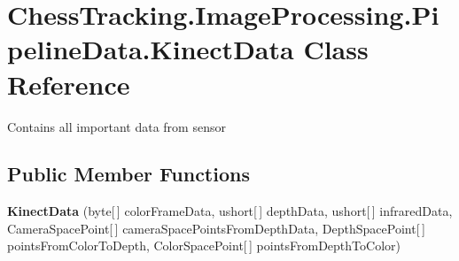 \hypertarget{class_chess_tracking_1_1_image_processing_1_1_pipeline_data_1_1_kinect_data}{}\section{Chess\+Tracking.\+Image\+Processing.\+Pipeline\+Data.\+Kinect\+Data Class Reference}
\label{class_chess_tracking_1_1_image_processing_1_1_pipeline_data_1_1_kinect_data}


Contains all important data from sensor  


\subsection*{Public Member Functions}
\begin{DoxyCompactItemize}
\item 
\mbox{\label{class_chess_tracking_1_1_image_processing_1_1_pipeline_data_1_1_kinect_data_aca8fcfbb9e34bd7f3ba2d777d5a402c3}} 
{\bfseries Kinect\+Data} (byte\mbox{[}$\,$\mbox{]} color\+Frame\+Data, ushort\mbox{[}$\,$\mbox{]} depth\+Data, ushort\mbox{[}$\,$\mbox{]} infrared\+Data, Camera\+Space\+Point\mbox{[}$\,$\mbox{]} camera\+Space\+Points\+From\+Depth\+Data, Depth\+Space\+Point\mbox{[}$\,$\mbox{]} points\+From\+Color\+To\+Depth, Color\+Space\+Point\mbox{[}$\,$\mbox{]} points\+From\+Depth\+To\+Color)
\end{DoxyCompactItemize}
